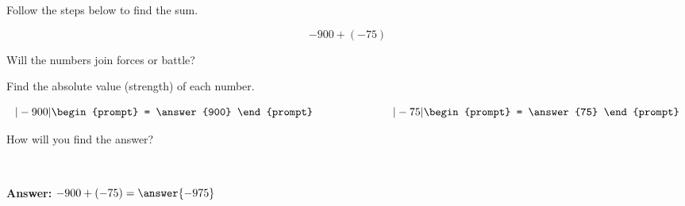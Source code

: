 \documentclass{ximera}[font=12pt]
\begin{document}
\begin{problem}
Follow the steps below to find the sum.

\[ -900 + (-75) \]

Will the numbers join forces or battle?

\begin{multipleChoice}
\end{multipleChoice}

\begin{problem}
Find the absolute value (strength) of each number.

\[ |-900| \begin{prompt} = \answer{900} \end{prompt} \hspace{1in} |-75| \begin{prompt} = \answer{75} \end{prompt} \]

\begin{problem}
How will you find the answer?

~ \\[0.5em]
\begin{multipleChoice}
\end{multipleChoice}
 
\begin{problem}


\textbf{Answer:}  $-900 + (-75) = \answer{-975}$

\end{problem}
\end{problem}
\end{problem}
\end{problem}
\end{document}
